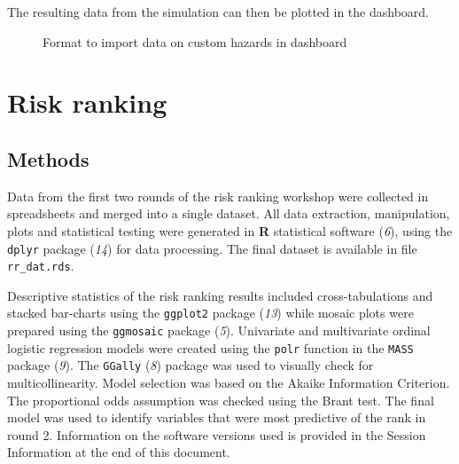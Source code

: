 \documentclass[
  letterpaper,
  DIV=11,
  numbers=noendperiod]{scrartcl}
\begin{document}
The resulting data from the simulation can then be plotted in the
dashboard.

\begin{figure}


\caption{\label{fig-simulation-input}Format to import data on custom
hazards in dashboard}

\end{figure}%

\section{Risk ranking}\label{risk-ranking}

\subsection{Methods}\label{methods}

Data from the first two rounds of the risk ranking workshop were
collected in spreadsheets and merged into a single dataset. All data
extraction, manipulation, plots and statistical testing were generated
in \textbf{R} statistical software (\emph{6}), using the \texttt{dplyr}
package (\emph{14}) for data processing. The final dataset is available
in file \texttt{rr\_dat.rds}.

Descriptive statistics of the risk ranking results included
cross-tabulations and stacked bar-charts using the \texttt{ggplot2}
package (\emph{13}) while mosaic plots were prepared using the
\texttt{ggmosaic} package (\emph{5}). Univariate and multivariate
ordinal logistic regression models were created using the \texttt{polr}
function in the \texttt{MASS} package (\emph{9}). The \texttt{GGally}
(\emph{8}) package was used to visually check for multicollinearity.
Model selection was based on the Akaike Information Criterion. The
proportional odds assumption was checked using the Brant test. The final
model was used to identify variables that were most predictive of the
rank in round 2. Information on the software versions used is provided
in the Session Information at the end of this document.
\end{document}
